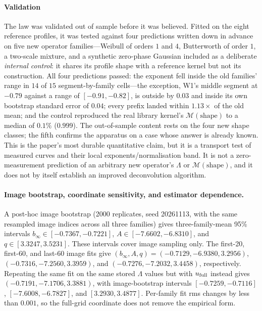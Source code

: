 \documentclass[10pt,journal]{IEEEtran}
\newcommand{\Lam}{\Lambda}
\begin{document}
\paragraph*{Validation}
The law was validated out of sample before it was believed. Fitted on the eight reference
profiles, it was tested against four predictions written down in advance on five new operator
families---Weibull of orders $1$ and $4$, Butterworth of order $1$, a two-scale mixture, and a
synthetic zero-phase Gaussian included as a deliberate \emph{internal control}: it shares its
profile shape with a reference kernel but not its construction. All four predictions passed:
the exponent fell inside the old families' range in $14$ of $15$ segment-by-family cells---the
exception, W1's middle segment at $-0.79$ against a range of $[-0.91,-0.82]$, is outside by
$0.03$ and inside its own bootstrap standard error of $0.04$; every prefix landed within
$1.13\times$ of the old mean; and the control reproduced the real library kernel's $\mathcal M(\mathrm{shape})$ to a
median of $0.1\%$ ($0.999$). The out-of-sample content rests on the four new shape classes; the
fifth confirms the apparatus on a case whose answer is already known. This is the paper's most
durable quantitative claim, but it is a transport test of measured curves and their local
exponents/normalisation band. It is not a zero-measurement prediction of an arbitrary new
operator's $\Lam$ or $\mathcal M(\mathrm{shape})$, and it does not by itself establish an
improved deconvolution algorithm.

\paragraph*{Image bootstrap, coordinate sensitivity, and estimator dependence.}
A post-hoc image bootstrap (2000 replicates, seed 20261113, with the same resampled image
indices across all three families) gives three-family-mean 95\% intervals
$b_\infty\in[-0.7367,-0.7221]$, $A\in[-7.6602,-6.8310]$, and $q\in[3.3247,3.5231]$.
These intervals cover image sampling only. The first-20, first-60, and last-60 image fits give
$(b_\infty,A,q)=(-0.7129,-6.9380,3.2956)$, $(-0.7316,-7.2560,3.3959)$, and
$(-0.7276,-7.2032,3.4458)$, respectively. Repeating the same fit on the same stored $\Lam$
values but with $u_{\rm full}$ instead gives $(-0.7191,-7.1706,3.3881)$, with image-bootstrap
intervals $[-0.7259,-0.7116]$, $[-7.6008,-6.7827]$, and $[3.2930,3.4877]$. Per-family fit rms
changes by less than $0.001$, so the full-grid coordinate does not remove the empirical form.
\end{document}
